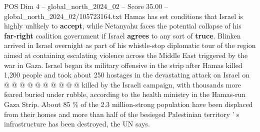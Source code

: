 \begin{textsample}{POS Dim 4 – global\_north\_2024\_02 – Score 35.00 – global\_north\_2024\_02/105723164.txt}
Hamas has set conditions that Israel is highly unlikely to \textbf{accept}, while Netanyahu faces the potential collapse of his \textbf{far-right} coalition government if Israel \textbf{agrees} to any sort of \textbf{truce}.
Blinken arrived in Israel overnight as part of his whistle-stop diplomatic tour of the region aimed at containing escalating violence across the Middle East triggered by the war in Gaza.
Israel began its military offensive in the strip after Hamas killed 1,200 people and took about 250 hostages in the devastating attack on Israel on @ @ @ @ @ @ @ @ @ @ killed by the Israeli campaign, with thousands more feared buried under rubble, according to the health ministry in the Hamas-run Gaza Strip.
About 85 \% of the 2.3 million-strong population have been displaced from their homes and more than half of the besieged Palestinian territory ' s infrastructure has been destroyed, the UN says.

\end{textsample}
